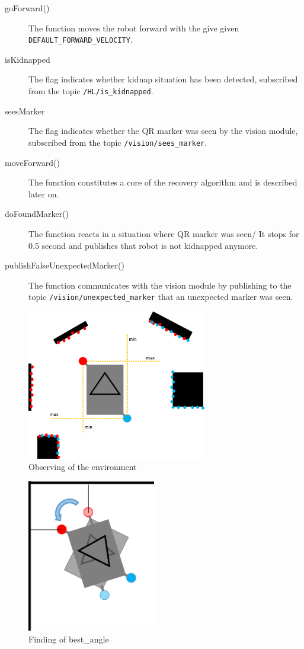 \begin{description}
\item[goForward()] The function moves the robot forward with the give given \texttt{DEFAULT\_FORWARD\_VELOCITY}.
\item[isKidnapped] The flag indicates whether kidnap situation has been detected, subscribed from the topic \texttt{/HL/is\_kidnapped}.
\item[seesMarker] The flag indicates whether the QR marker was seen by the vision module, subscribed from the topic \texttt{/vision/sees\_marker}.
\item[moveForward()] The function constitutes a core of the recovery algorithm and is described later on.
\item[doFoundMarker()] The function reacts in a situation where QR marker was seen/ It stops for 0.5 second and publishes that robot is not kidnapped anymore.
\item[publishFalseUnexpectedMarker()] The function communicates with the vision module by publishing to the topic \texttt{/vision/unexpected\_marker} that an unexpected marker was seen.
\end{description}

\begin{figure}[ht]
\centering
\includegraphics[width=0.7\textwidth]{graphics/sensoren.png}
\caption{Observing of the environment}
\label{sensor}
\centering
\end{figure}

\begin{figure}[ht]
\centering
\includegraphics[width=0.5\textwidth]{graphics/find_best_angle.png}
\caption{Finding of best\_angle}
\label{best}
\centering
\end{figure}

